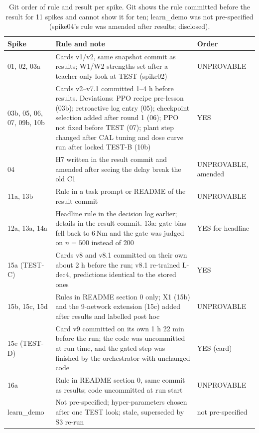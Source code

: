 \begin{table}[htbp]
\centering
\caption{Git order of rule and result per spike. Git shows the rule committed before the result for 11 spikes and cannot show it for ten; learn\_demo was not pre-specified (spike04's rule was amended after results; disclosed).}
\label{tab:audit}
\begin{tabular}{@{}p{3.3cm}p{9.2cm}l@{}}
\toprule
Spike & Rule and note & Order \\ \midrule
01, 02, 03a & Cards v1/v2, same snapshot commit as results; W1/W2 strengths set after a teacher-only look at TEST (spike02) & UNPROVABLE \\
03b, 05, 06, 07, 09b, 10b & Cards v2--v7.1 committed 1--4 h before results. Deviations: PPO recipe pre-lesson (03b); retroactive log entry (05); checkpoint selection added after round 1 (06); PPO not fixed before TEST (07); plant step changed after CAL tuning and dose curve run after locked TEST-B (10b) & YES \\
04 & H7 written in the result commit and amended after seeing the delay break the old C1 & UNPROVABLE, amended \\
11a, 13b & Rule in a task prompt or README of the result commit & UNPROVABLE \\
12a, 13a, 14a & Headline rule in the decision log earlier; details in the result commit. 13a: gate bias fell back to 6\,Nm and the gate was judged on $n{=}500$ instead of 200 & YES for headline \\
15a (TEST-C) & Cards v8 and v8.1 committed on their own about 2 h before the run; v8.1 re-trained L-dec4, predictions identical to the stored ones & YES \\
15b, 15c, 15d & Rules in README section 0 only; X1 (15b) and the 9-network extension (15c) added after results and labelled post hoc & UNPROVABLE \\
15e (TEST-D) & Card v9 committed on its own 1 h 22 min before the run; the code was uncommitted at run time, and the gated step was finished by the orchestrator with unchanged code & YES (card) \\
16a & Rule in README section 0, same commit as results; code uncommitted at run start & UNPROVABLE \\
learn\_demo & Not pre-specified; hyper-parameters chosen after one TEST look; stale, superseded by S3 re-run & not pre-specified \\
\bottomrule
\end{tabular}
\end{table}


